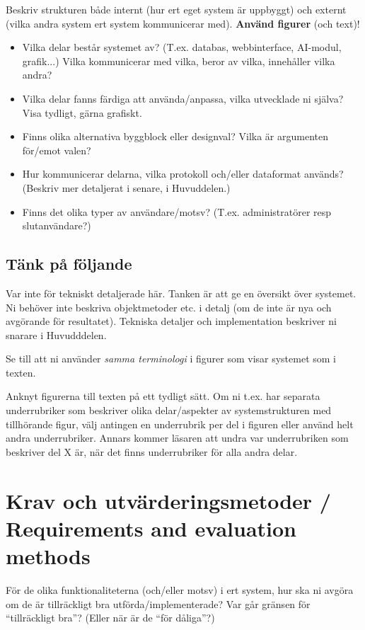 \documentclass[a4paper,12pt]{article}
\begin{document}
Beskriv strukturen både internt (hur ert eget system är uppbyggt) och externt (vilka andra system ert system kommunicerar med). \textbf{Använd figurer} (och text)!
\begin{itemize}
\item Vilka delar består systemet av? (T.ex. databas, webbinterface, AI-modul, grafik...) Vilka kommunicerar med vilka, beror av vilka, innehåller vilka andra?
\item Vilka delar fanns färdiga att använda/anpassa, vilka utvecklade ni själva? Visa tydligt, gärna grafiskt.
\item Finns olika alternativa byggblock eller designval? Vilka är argumenten för/emot valen?
\item Hur kommunicerar delarna, vilka protokoll och/eller dataformat används? (Beskriv mer detaljerat i senare, i Huvuddelen.)
\item Finns det olika typer av användare/motsv? (T.ex. administratörer resp slut\-an\-vän\-dare?)
\end{itemize}

\subsection{Tänk på följande}

Var inte för tekniskt detaljerade här.  Tanken är att ge en översikt över systemet.  Ni behöver inte beskriva objektmetoder etc. i detalj (om de inte är nya och avgörande för resultatet). Tekniska detaljer och implementation beskriver ni snarare i Huvudddelen.

Se till att ni använder \emph{samma terminologi} i figurer som visar systemet som i texten. 

Anknyt figurerna till texten på ett tydligt sätt. Om ni t.ex. har separata underrubriker som beskriver olika delar/aspekter av systemstrukturen med tillhörande figur, välj antingen en underrubrik per del i figuren eller använd helt andra underrubriker.  Annars kommer läsaren att undra var underrubriken som beskriver del X är, när det finns underrubriker för alla andra delar.

\section{Krav och utvärderingsmetoder / Requirements and evaluation methods}\label{sec:krav}

För de olika funktionaliteterna (och/eller motsv) i ert system, hur ska ni avgöra om de är tillräckligt bra utförda/implementerade? Var går gränsen för ``tillräckligt bra''? (Eller när är de ``för dåliga''?)
\end{document}
